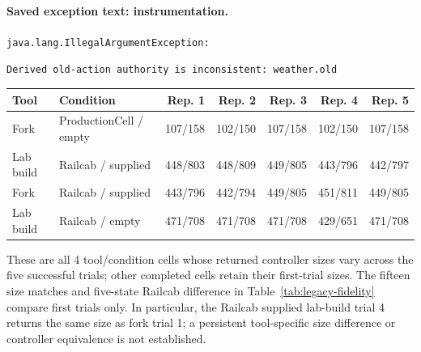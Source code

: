 \paragraph{Saved exception text: instrumentation.}
\noindent\texttt{java.lang.IllegalArgumentException:}\par\noindent\texttt{Derived old-action authority is inconsistent: weather.old}\par
\begin{center}\small
\begin{tabular}{@{}llrrrrr@{}}\toprule
Tool & Condition & Rep. 1 & Rep. 2 & Rep. 3 & Rep. 4 & Rep. 5\\\midrule
Fork & ProductionCell / empty & 107/158 & 102/150 & 107/158 & 102/150 & 107/158\\
Lab build & Railcab / supplied & 448/803 & 448/809 & 449/805 & 443/796 & 442/797\\
Fork & Railcab / supplied & 443/796 & 442/794 & 449/805 & 451/811 & 449/805\\
Lab build & Railcab / empty & 471/708 & 471/708 & 471/708 & 429/651 & 471/708\\
\bottomrule\end{tabular}\end{center}
These are all 4 tool/condition cells whose returned controller sizes vary across the five successful trials; other completed cells retain their first-trial sizes. The fifteen size matches and five-state Railcab difference in Table~\ref{tab:legacy-fidelity} compare first trials only. In particular, the Railcab supplied lab-build trial 4 returns the same size as fork trial 1; a persistent tool-specific size difference or controller equivalence is not established.
